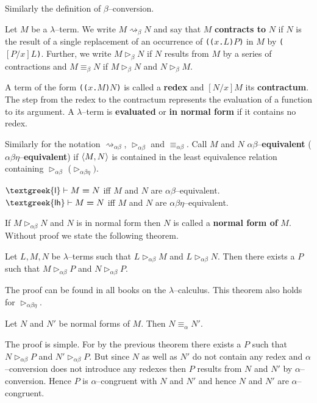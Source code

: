 Similarly the definition of $\beta$--conversion.
\begin{defn}
\index{$\rightsquigarrow_{\beta}, \triangleright_{\beta}, \equiv_{\beta}$}%
Let $M$ be a $\lambda$--term. We write $M \rightsquigarrow_{\beta} N$ and
say that $M$ \textbf{contracts to} $N$ if $N$ is the result of a
single replacement of an occurrence of {\tt ((\stlambda$x$.$L$)$P$)}
in $M$ by {\tt ($[P/x]L$)}. Further, we write $M \triangleright_{\beta} N$ 
if $N$ results from $M$ by a series of contractions and 
$M \equiv_{\beta} N$ if $M \triangleright_{\beta} N$ and 
$N \triangleright_{\beta} M$.
\end{defn}
A term of the form {\tt ((\stlambda$x$.$M$)$N$)} is called a 
\textbf{redex} and $[N/x]M$ its \textbf{contractum}. The step from 
the redex to the contractum 
represents the evaluation of a function to its argument. A 
$\lambda$--term is \textbf{evaluated} or \textbf{in normal form} 
if it contains no redex.

Similarly for the notation $\rightsquigarrow_{\alpha\beta}$,
$\triangleright_{\alpha\beta}$ and $\equiv_{\alpha\beta}$. Call
$M$ and $N$ $\alpha\beta$--\textbf{equi\-va\-lent}
($\alpha\beta\eta$--\textbf{equivalent}) if $\langle M, N\rangle$ is 
contained in the least equivalence relation containing
$\triangleright_{\alpha\beta}$
($\triangleright_{\alpha\beta\eta})$.
\begin{prop}
$\mbox{\sf\textgreek{l}} \vdash M \boldsymbol{=} N$ iff $M$ and $N$ are
$\alpha\beta$--equivalent. $\mbox{\sf\textgreek{lh}} \vdash %
M \boldsymbol{=} N$ iff $M$ and $N$ are $\alpha\beta\eta$--equivalent.
\end{prop}
If $M \triangleright_{\alpha\beta} N$ and $N$ is in normal form
then $N$ is called a \textbf{normal form of} $M$. Without proof we
state the following theorem.
\begin{thm}
Let $L, M, N$ be $\lambda$--terms such that
$L \triangleright_{\alpha\beta} M$ and $L \triangleright_{\alpha\beta} 
N$. Then there exists a $P$
such that $M \triangleright_{\alpha\beta} P$ and $N
\triangleright_{\alpha\beta} P$.
\end{thm}
The proof can be found in all books on the $\lambda$--calculus.
This theorem also holds for $\triangleright_{\alpha\beta\eta}$.
\begin{cor}
Let $N$ and $N'$ be normal forms of $M$. Then $N \equiv_{\alpha}
N'$.
\end{cor}
The proof is simple. For by the previous theorem there exists a $P$ such
that $N \triangleright_{\alpha\beta} P$ and $N'
\triangleright_{\alpha\beta} P$. But since $N$ as well as $N'$ do
not contain any redex and $\alpha$--conversion does not introduce
any redexes then $P$ results from $N$ and $N'$ by
$\alpha$--conversion. Hence $P$ is $\alpha$--congruent with $N$
and $N'$ and hence $N$ and $N'$ are $\alpha$--congruent.

